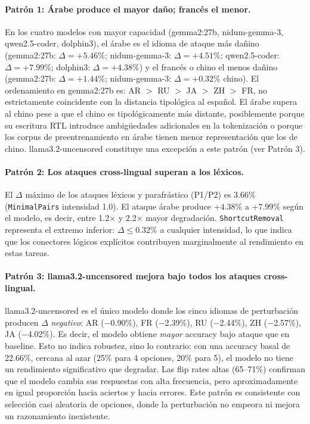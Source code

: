 \documentclass[11pt]{article}
\begin{document}
\paragraph{Patrón 1: Árabe produce el mayor daño; francés el menor.}
En los cuatro modelos con mayor capacidad (gemma2:27b, nidum-gemma-3,
qwen2.5-coder, dolphin3), el árabe es el idioma de ataque más dañino
(gemma2:27b: $\Delta = +5.46\%$; nidum-gemma-3: $\Delta = +4.51\%$;
qwen2.5-coder: $\Delta = +7.99\%$; dolphin3: $\Delta = +4.38\%$) y el
francés o chino el menos dañino (gemma2:27b: $\Delta = +1.44\%$;
nidum-gemma-3: $\Delta = +0.32\%$ chino). El ordenamiento en gemma2:27b
es: AR $>$ RU $>$ JA $>$ ZH $>$ FR, no estrictamente coincidente con la
distancia tipológica al español. El árabe supera al chino pese a que el
chino es tipológicamente más distante, posiblemente porque su escritura
RTL introduce ambigüedades adicionales en la tokenización o porque los
corpus de preentrenamiento en árabe tienen menor representación que los
de chino. llama3.2-uncensored constituye una excepción a este patrón
(ver Patrón 3).
 
\paragraph{Patrón 2: Los ataques cross-lingual superan a los léxicos.}
El $\Delta$ máximo de los ataques léxicos y parafrástico (P1/P2) es
3.66\% (\texttt{MinimalPairs} intensidad 1.0). El ataque árabe produce
$+4.38\%$ a $+7.99\%$ según el modelo, es decir, entre 1.2× y 2.2× mayor
degradación. \texttt{ShortcutRemoval} representa el extremo inferior:
$\Delta \leq 0.32\%$ a cualquier intensidad, lo que indica que los
conectores lógicos explícitos contribuyen marginalmente al rendimiento
en estas tareas.
 
\paragraph{Patrón 3: llama3.2-uncensored mejora bajo todos los ataques
cross-lingual.}
llama3.2-uncensored es el único modelo donde los cinco idiomas de
perturbación producen $\Delta$ \textit{negativo}: AR ($-$0.90\%),
FR ($-$2.39\%), RU ($-$2.44\%), ZH ($-$2.57\%), JA ($-$4.02\%). Es
decir, el modelo obtiene \textit{mayor} accuracy bajo ataque que en
baseline. Esto no indica robustez, sino lo contrario: con una accuracy
basal de 22.66\%, cercana al azar (25\% para 4 opciones, 20\% para 5),
el modelo no tiene un rendimiento significativo que degradar. Las
flip rates altas (65--71\%) confirman que el modelo cambia sus
respuestas con alta frecuencia, pero aproximadamente en igual proporción
hacia aciertos y hacia errores. Este patrón es consistente con
selección casi aleatoria de opciones, donde la perturbación no
empeora ni mejora un razonamiento inexistente.
 
\end{document}
